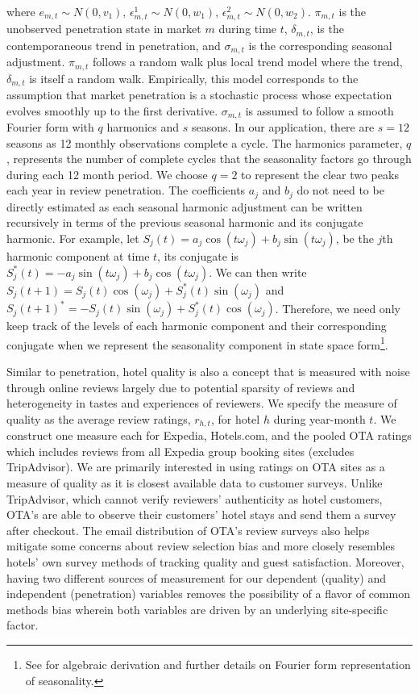 \documentclass[mksc,blindrev]{informs3} %
\begin{document}
where $e_{m,t}\sim N(0,v_1)\text{, }\epsilon_{m,t}^{1}\sim N(0,w_1)\text{, }\epsilon_{m,t}^{2}\sim N(0,w_2)$. $\pi_{m,t}$ is the unobserved penetration state in market $m$ during time $t$, $\delta_{m,t}$, is the contemporaneous trend in penetration, and $\sigma_{m,t}$ is the corresponding seasonal adjustment. $\pi_{m,t}$ follows a random walk plus local trend model where the trend, $\delta_{m,t}$ is itself a random walk. Empirically, this model corresponds to the assumption that market penetration is a stochastic process whose expectation evolves smoothly up to the first derivative. $\sigma_{m,t}$ is assumed to follow a smooth Fourier form with $q$ harmonics and $s$ seasons. In our application, there are $s=12$ seasons as 12 monthly observations complete a cycle. The harmonics parameter, $q$, represents the number of complete cycles that the seasonality factors go through during each 12 month period. We choose $q=2$ to represent the clear two peaks each year in review penetration. The coefficients $a_j$ and $b_j$ do not need to be directly estimated as each seasonal harmonic adjustment can be written recursively in terms of the previous seasonal harmonic and its conjugate harmonic. For example, let $S_j(t)=a_j\cos(t\omega_j)+b_j\sin(t\omega_j)$, be the $j$th harmonic component at time $t$, its conjugate is $S_j^{*}(t)=-a_j\sin(t\omega_j)+b_j\cos(t\omega_j)$. We can then write $S_j(t+1)=S_j(t)\cos(\omega_j)+S_j^{*}(t)\sin(\omega_j)$ and $S_j(t+1)^{*}=-S_j(t)\sin(\omega_j)+S_j^{*}(t)\cos(\omega_j)$. Therefore, we need only keep track of the levels of each harmonic component and their corresponding conjugate when we represent the seasonality component in state space form\footnote{See \citet{petrisDLM} for algebraic derivation and further details on Fourier form representation of seasonality.}.

Similar to penetration, hotel quality is also a concept that is measured with noise through online reviews largely due to potential sparsity of reviews and heterogeneity in tastes and experiences of reviewers. We specify the measure of quality as the average review ratings, $r_{h,t}$, for hotel $h$ during year-month $t$. We construct one measure each for Expedia, Hotels.com, and the pooled OTA ratings which includes reviews from all Expedia group booking sites (excludes TripAdvisor). We are primarily interested in using ratings on OTA sites as a measure of quality as it is closest available data to customer surveys. Unlike TripAdvisor, which cannot verify reviewers' authenticity as hotel customers, OTA's are able to observe their customers' hotel stays and send them a survey after checkout. The email distribution of OTA's review surveys also helps mitigate some concerns about review selection bias and more closely resembles hotels' own survey methods of tracking quality and guest satisfaction. Moreover, having two different sources of measurement for our dependent (quality) and independent (penetration) variables removes the possibility of a flavor of common methods bias wherein both variables are driven by an underlying site-specific factor.
\end{document}
